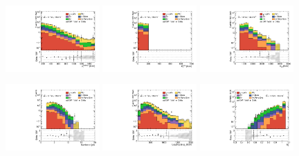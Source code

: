 \begin{figure}[ht!]
  \begin{center}

    \includegraphics[width=0.32\textwidth]{images_tmp/results/fr2/can_VRL1_ph_pt0_afterFit.pdf}
    \includegraphics[width=0.32\textwidth]{images_tmp/results/fr2/can_VRL1_met_et_afterFit.pdf}
    \includegraphics[width=0.32\textwidth]{images_tmp/results/fr2/can_VRL1_meff_afterFit.pdf}

    \includegraphics[width=0.32\textwidth]{images_tmp/results/fr2/can_VRL1_jet_n_afterFit}
    \includegraphics[width=0.32\textwidth]{images_tmp/results/fr2/can_VRL1_jet_pt0_afterFit.pdf}
    \includegraphics[width=0.32\textwidth]{images_tmp/results/fr2/can_VRL1_rt4_afterFit}


\end{center}
\end{figure}
